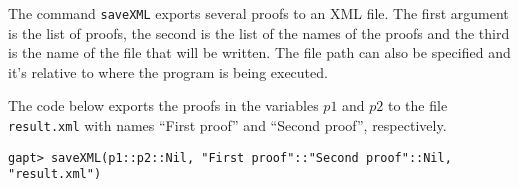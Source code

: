 \documentclass[a4paper,11pt]{article}
\begin{document}
The command \texttt{saveXML} exports several proofs to an XML file.
% 
% 
% 
% 
The first argument is the list of proofs,
the second is the list of the names of the proofs and the third is the name of
the file that will be written. The file path can also be specified and it's
relative to where the program is being executed.

The code below exports the proofs in the variables $p1$ and $p2$ to the file
\texttt{result.xml} with names ``First proof'' and ``Second proof'',
respectively.
\begin{lstlisting}
gapt> saveXML(p1::p2::Nil, "First proof"::"Second proof"::Nil, "result.xml")
\end{lstlisting}

\end{document}
